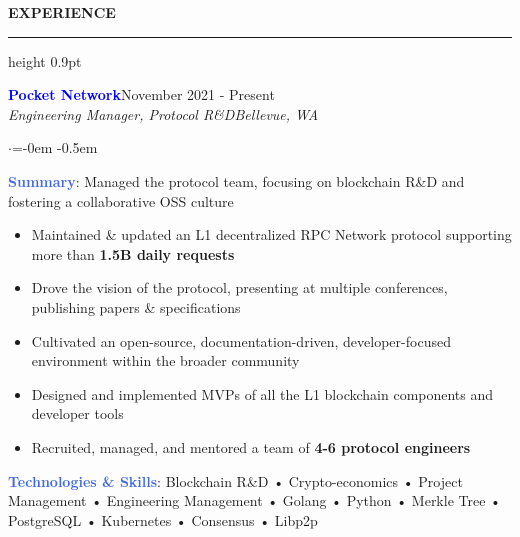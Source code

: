 \documentclass[
    11pt, %
]{resume} %
\newenvironment{rSectionCustom}[1]{
  \Large
  \sectionskip
  \textbf{\textcolor{Cerulean}{\MakeUppercase{#1}}}
  \vspace{0.5em}
  {\color{Blue}\hrule height 0.9pt}
  \vspace{0.25em}

  \begin{list}{}{
    \setlength{\leftmargin}{1.5em}
  }
  \item[]
}{
    \vspace{1em}
  \end{list}
}
\newenvironment{rSubsection2}[4]{
  \normalsize
  \hspace{-18pt}\textcolor{Blue}{\textbf{\large #1}}\hfill{#2}
  \\
  \hspace*{-18pt}\emph{#3}\hfill\emph{#4}
  \begin{list}{$\cdot$}{\leftmargin=-0em}
  \itemsep -0.5em \vspace{-0.25em}
}{
\vspace{1em}
  \end{list}
}
\begin{document}

\begin{rSectionCustom}{Experience}

    \begin{rSubsection2}{Pocket Network}{November 2021 - Present}{Engineering Manager, Protocol R\&D}{Bellevue, WA}

        \item[] \textcolor{RoyalBlue}{\textbf{Summary}}: Managed the protocol team, focusing on blockchain R\&D and fostering a collaborative OSS culture
        \begin{itemize}[leftmargin=*]
            \item Maintained & updated an L1 decentralized RPC Network protocol supporting more than \textbf{1.5B daily requests}
            \item Drove the vision of the protocol, presenting at multiple conferences, publishing papers \& specifications
            \item Cultivated an open-source, documentation-driven, developer-focused environment within the broader community
            \item Designed and implemented MVPs of all the L1 blockchain components and developer tools
            \item Recruited, managed, and mentored a team of \textbf{4-6 protocol engineers}
        \end{itemize}
        \vspace{0.5em}
        \item[] \textcolor{RoyalBlue}{\textbf{Technologies \& Skills}}: Blockchain R\&D • Crypto-economics • Project Management • Engineering Management • Golang • Python • Merkle Tree • PostgreSQL • Kubernetes • Consensus • Libp2p
    \end{rSubsection2}


\end{rSectionCustom}
\end{document}
